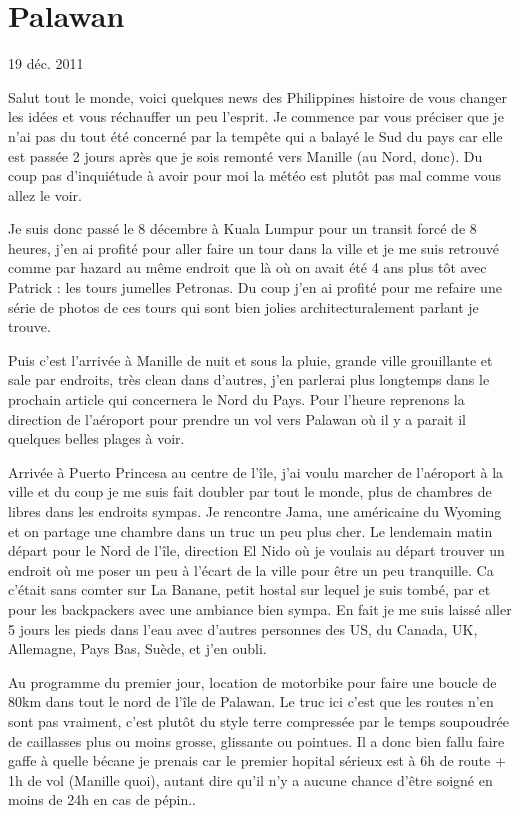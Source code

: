 \section{Palawan}

19 déc. 2011

\begin{multicols}{2}

Salut tout le monde, voici quelques news des Philippines histoire de vous changer les idées et vous réchauffer un peu l'esprit.
Je commence par vous préciser que je n'ai pas du tout été concerné par la tempête qui a balayé le Sud du pays car elle est passée 2 jours après que je sois remonté vers Manille (au Nord, donc). Du coup pas d'inquiétude à avoir pour moi la météo est plutôt pas mal comme vous allez le voir.

Je suis donc passé le 8 décembre à Kuala Lumpur pour un transit forcé de 8 heures, j'en ai profité pour aller faire un tour dans la ville et je me suis retrouvé comme par hazard au même endroit que là où on avait été 4 ans plus tôt avec Patrick : les tours jumelles Petronas. Du coup j'en ai profité pour me refaire une série de photos de ces tours qui sont bien jolies architecturalement parlant je trouve.


Puis c'est l'arrivée à Manille de nuit et sous la pluie, grande ville grouillante et sale par endroits, très clean dans d'autres, j'en parlerai plus longtemps dans le prochain article qui concernera le Nord du Pays. Pour l'heure reprenons la direction de l'aéroport pour prendre un vol vers Palawan où il y a parait il quelques belles plages à voir.

Arrivée à Puerto Princesa au centre de l'île, j'ai voulu marcher de l'aéroport à la ville et du coup je me suis fait doubler par tout le monde, plus de chambres de libres dans les endroits sympas. Je rencontre Jama, une américaine du Wyoming et on partage une chambre dans un truc un peu plus cher. Le lendemain matin départ pour le Nord de l'île, direction El Nido où je voulais au départ trouver un endroit où me poser un peu à l'écart de la ville pour être un peu tranquille. Ca c'était sans comter sur La Banane, petit hostal sur lequel je suis tombé, par et pour les backpackers avec une ambiance bien sympa. En fait je me suis laissé aller 5 jours les pieds dans l'eau avec d'autres personnes des US, du Canada, UK, Allemagne, Pays Bas, Suède, et j'en oubli.

Au programme du premier jour, location de motorbike pour faire une boucle de 80km dans tout le nord de l'île de Palawan. Le truc ici c'est que les routes n'en sont pas vraiment, c'est plutôt du style terre compressée par le temps soupoudrée de caillasses plus ou moins grosse, glissante ou pointues. Il a donc bien fallu faire gaffe à quelle bécane je prenais car le premier hopital sérieux est à 6h de route + 1h de vol (Manille quoi), autant dire qu'il n'y a aucune chance d'être soigné en moins de 24h en cas de pépin..


\end{multicols}
